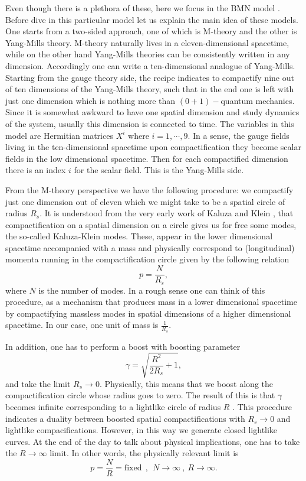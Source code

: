 \documentclass[11pt,english]{article}
\newcommand{\be}{\begin{equation}}
\newcommand{\ee}{\end{equation}}
\def\nn{\nonumber}
\numberwithin{equation}{section}
\begin{document}
Even though there is a plethora of these, here we focus in the BMN model \cite{Berenstein2002}. Before dive in this particular model let us explain the main idea of these models. One starts from a two-sided approach, one of which is M-theory and the other is Yang-Mills theory. M-theory naturally lives in a eleven-dimensional spacetime, while on the other hand Yang-Mills theories can be consistently written in any dimension. Accordingly one can write a ten-dimensional analogue of Yang-Mills. Starting from the gauge theory side, the recipe indicates to compactify nine out of ten dimensions of the Yang-Mills theory, such that in the end one is left with just one dimension which is nothing more than $(0+1)-$quantum mechanics. Since it is somewhat awkward to have one spatial dimension and study dynamics of the system, usually this dimension is connected to time.  The variables in this model are Hermitian matrices $X^i$ where $i=1,\cdots,9$. In a sense, the gauge fields living in the ten-dimensional spacetime upon compactification they become scalar fields in the low dimensional spacetime. Then for each compactified dimension there is an index $i$ for the scalar field.  This is the Yang-Mills side. 

From the M-theory perspective we have the following procedure: we compactify just one dimension out of eleven which we might take to be a spatial circle of radius $R_s$. It is understood from the very early work of Kaluza \cite{Kaluza} and Klein \cite{Klein}, that compactification on a spatial dimension on a circle gives us for free some modes, the so-called Kaluza-Klein modes. These, appear in the lower dimensional spacetime accompanied with a mass and physically correspond to (longitudinal) momenta running in the compactification circle given by the following relation
\be\nn 
p=\frac{N}{R_s},
\ee   
where $N$ is the number of modes. In a rough sense one can think of this procedure, as a mechanism that produces mass in a lower dimensional spacetime by compactifying massless modes in spatial dimensions of a higher dimensional spacetime. In our case, one unit of mass is $\frac{1}{R_s}$.

In addition, one has to perform a boost with boosting parameter 
\be 
\gamma=\sqrt{\frac{R^2}{2R_s}+1},
\ee
and take the limit $R_s\to 0$. Physically, this means that we boost along the compactification circle whose radius goes to zero.  The result of this is that $\gamma$ becomes infinite corresponding to a lightlike circle of radius $R$ \cite{Seiberg1997}. This procedure indicates a duality between boosted spatial compactifications with $R_s\to 0$ and lightlike compacifications.  However, in this way we generate closed lightlike curves. At the end of the day to talk about physical implications, one has to take the $R\to \infty$ limit. In other words, the physically relevant limit is 
\be 
p=\frac{N}{R}=\text{fixed}~~,~~N\to \infty~,~ R\to\infty.
\ee 
\end{document}
